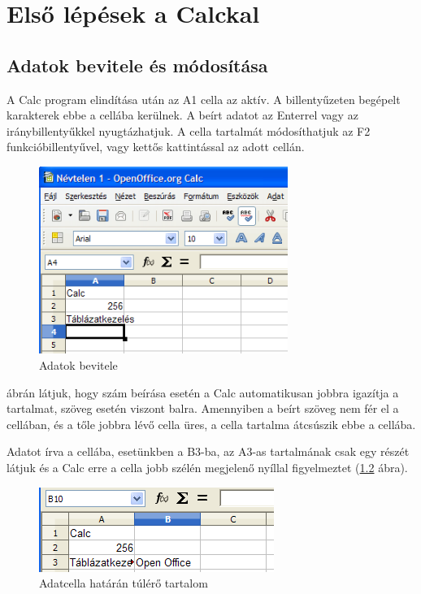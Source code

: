 \chapter{Első lépések a Calckal}
\thispagestyle{empty}

\section{Adatok bevitele és módosítása}

A Calc program elindítása után az A1 cella az aktív. A
billentyűzeten begépelt karakterek ebbe a cellába kerülnek. A
beírt adatot az Enterrel vagy az iránybillentyűkkel
nyugtázhatjuk. A cella tartalmát módosíthatjuk az F2
funkcióbillentyűvel, vagy kettős kattintással az adott
cellán. 

\begin{figure}[!h]
\begin{center}
\includegraphics[width=8.102cm]{oocalcv1-img5.png}
\caption{Adatok bevitele}\label{Adatbevitel}
\end{center}
\end{figure}

 ábrán látjuk, hogy szám beírása esetén a Calc
automatikusan jobbra igazítja a tartalmat,  szöveg esetén
viszont balra. Amennyiben a beírt szöveg nem fér el a cellában,
és a tőle jobbra lévő cella üres, a cella tartalma
átcsúszik ebbe a cellába.

Adatot írva a cellába, esetünkben a B3-ba, az A3-as tartalmának
csak egy részét látjuk és a Calc erre a cella jobb szélén
megjelenő nyíllal figyelmeztet (\ref{AdatcellaTúl} ábra).

\begin{figure}[!h]
\begin{center}
\includegraphics[width=7.645cm]{oocalcv1-img6.png}
\caption{Adatcella határán túlérő tartalom}\label{AdatcellaTúl}
\end{center}
\end{figure}

